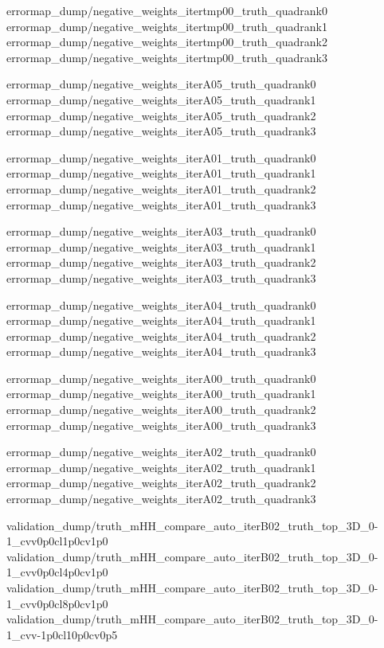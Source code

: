 
{errormap_dump/negative_weights_itertmp00_truth_quadrank0}
{errormap_dump/negative_weights_itertmp00_truth_quadrank1}
{errormap_dump/negative_weights_itertmp00_truth_quadrank2}
{errormap_dump/negative_weights_itertmp00_truth_quadrank3}

{errormap_dump/negative_weights_iterA05_truth_quadrank0}
{errormap_dump/negative_weights_iterA05_truth_quadrank1}
{errormap_dump/negative_weights_iterA05_truth_quadrank2}
{errormap_dump/negative_weights_iterA05_truth_quadrank3}

{errormap_dump/negative_weights_iterA01_truth_quadrank0}
{errormap_dump/negative_weights_iterA01_truth_quadrank1}
{errormap_dump/negative_weights_iterA01_truth_quadrank2}
{errormap_dump/negative_weights_iterA01_truth_quadrank3}

{errormap_dump/negative_weights_iterA03_truth_quadrank0}
{errormap_dump/negative_weights_iterA03_truth_quadrank1}
{errormap_dump/negative_weights_iterA03_truth_quadrank2}
{errormap_dump/negative_weights_iterA03_truth_quadrank3}

{errormap_dump/negative_weights_iterA04_truth_quadrank0}
{errormap_dump/negative_weights_iterA04_truth_quadrank1}
{errormap_dump/negative_weights_iterA04_truth_quadrank2}
{errormap_dump/negative_weights_iterA04_truth_quadrank3}

{errormap_dump/negative_weights_iterA00_truth_quadrank0}
{errormap_dump/negative_weights_iterA00_truth_quadrank1}
{errormap_dump/negative_weights_iterA00_truth_quadrank2}
{errormap_dump/negative_weights_iterA00_truth_quadrank3}

{errormap_dump/negative_weights_iterA02_truth_quadrank0}
{errormap_dump/negative_weights_iterA02_truth_quadrank1}
{errormap_dump/negative_weights_iterA02_truth_quadrank2}
{errormap_dump/negative_weights_iterA02_truth_quadrank3}


{validation_dump/truth_mHH_compare_auto_iterB02_truth_top_3D_0-1_cvv0p0cl1p0cv1p0}
{validation_dump/truth_mHH_compare_auto_iterB02_truth_top_3D_0-1_cvv0p0cl4p0cv1p0}
{validation_dump/truth_mHH_compare_auto_iterB02_truth_top_3D_0-1_cvv0p0cl8p0cv1p0}
{validation_dump/truth_mHH_compare_auto_iterB02_truth_top_3D_0-1_cvv-1p0cl10p0cv0p5}

